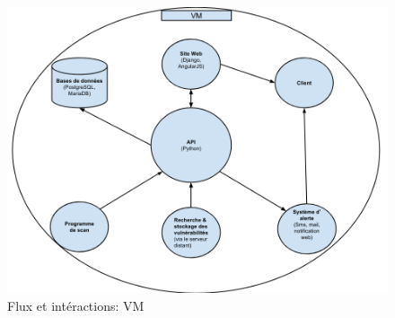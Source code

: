 \begin{figure}
  \caption{Flux et intéractions: VM}
  \centering
  \vspace*{0.5cm}
  \includegraphics[width=18cm]{vm.png}
\end{figure}
